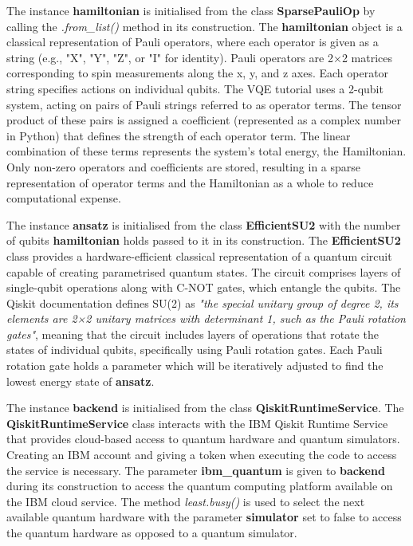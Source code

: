 \documentclass{article}
\begin{document}
{The instance \textbf{hamiltonian} is initialised from the class \textbf{SparsePauliOp} by calling the \textit{.from\_list()} method in its construction. The \textbf{hamiltonian} object is a classical representation of Pauli operators, where each operator is given as a string (e.g., "X", "Y", "Z", or "I" for identity). Pauli operators are 2×2 matrices corresponding to spin measurements along the x, y, and z axes\cite{DJORDJEVIC201229}. Each operator string specifies actions on individual qubits. The VQE tutorial uses a 2-qubit system, acting on pairs of Pauli strings referred to as operator terms. The tensor product of these pairs is assigned a coefficient (represented as a complex number in Python) that defines the strength of each operator term. The linear combination of these terms represents the system's total energy, the Hamiltonian. Only non-zero operators and coefficients are stored, resulting in a sparse representation of operator terms and the Hamiltonian as a whole to reduce computational expense\cite{EITCA2024}\cite{SparsePauliOp}\cite{PauliList}.

The instance \textbf{ansatz} is initialised from the class \textbf{EfficientSU2} with the number of qubits \textbf{hamiltonian} holds passed to it in its construction. The \textbf{EfficientSU2} class provides a hardware-efficient classical representation of a quantum circuit capable of creating parametrised quantum states\cite{ansatz}. The circuit comprises layers of single-qubit operations along with C-NOT gates, which entangle the qubits. The Qiskit documentation defines SU(2) as \textit{"the special unitary group of degree 2, its elements are 2×2 unitary matrices with determinant 1, such as the Pauli rotation gates"}\cite{EfficientSU2}, meaning that the circuit includes layers of operations that rotate the states of individual qubits, specifically using Pauli rotation gates. Each Pauli rotation gate holds a parameter which will be iteratively adjusted to find the lowest energy state of \textbf{ansatz}.

The instance \textbf{backend} is initialised from the class \textbf{QiskitRuntimeService}. The \textbf{QiskitRuntimeService} class interacts with the IBM Qiskit Runtime Service that provides cloud-based access to quantum hardware and quantum simulators. Creating an IBM account and giving a token when executing the code to access the service is necessary. The parameter \textbf{ibm\_quantum} is given to \textbf{backend} during its construction to access the quantum computing platform available on the IBM cloud service. The method \textit{least.busy()} is used to select the next available quantum hardware with the parameter \textbf{simulator} set to false to access the quantum hardware as opposed to a quantum simulator. 

}
\end{document}
